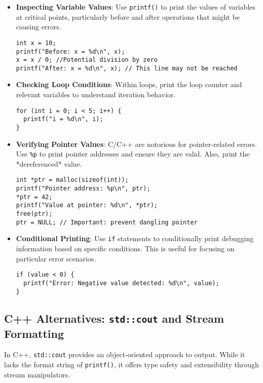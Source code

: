 \documentclass{article}
\begin{document}
{{{{\begin{itemize}
\item \textbf{Inspecting Variable Values}: Use \texttt{printf()} to print the values of variables at critical points, particularly before and after operations that might be causing errors.

\begin{verbatim}
int x = 10;
printf("Before: x = %d\n", x);
x = x / 0; //Potential division by zero
printf("After: x = %d\n", x); // This line may not be reached
\end{verbatim}

\item \textbf{Checking Loop Conditions}: Within loops, print the loop counter and relevant variables to understand iteration behavior.

\begin{verbatim}
for (int i = 0; i < 5; i++) {
  printf("i = %d\n", i);
}
\end{verbatim}

\item \textbf{Verifying Pointer Values}:  C/C++ are notorious for pointer-related errors. Use \texttt{\%p} to print pointer addresses and ensure they are valid. Also, print the *dereferenced* value.

\begin{verbatim}
int *ptr = malloc(sizeof(int));
printf("Pointer address: %p\n", ptr);
*ptr = 42;
printf("Value at pointer: %d\n", *ptr);
free(ptr);
ptr = NULL; // Important: prevent dangling pointer
\end{verbatim}

\item \textbf{Conditional Printing}: Use \texttt{if} statements to conditionally print debugging information based on specific conditions. This is useful for focusing on particular error scenarios.

\begin{verbatim}
if (value < 0) {
  printf("Error: Negative value detected: %d\n", value);
}
\end{verbatim}

\end{itemize}

\subsection*{C++ Alternatives: \texttt{std::cout} and Stream Formatting}

In C++, \texttt{std::cout} provides an object-oriented approach to output. While it lacks the format string of \texttt{printf()}, it offers type safety and extensibility through stream manipulators.

}}}}
\end{document}
